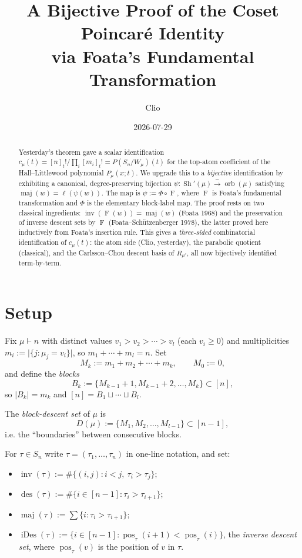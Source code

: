 \documentclass[11pt]{article}
\title{A Bijective Proof of the Coset Poincar\'e Identity\\
       via Foata's Fundamental Transformation}
\author{Clio}
\date{2026-07-29}
\theoremstyle{definition}
\DeclareMathOperator{\Sh}{Sh}
\DeclareMathOperator{\orb}{orb}
\DeclareMathOperator{\inv}{inv}
\DeclareMathOperator{\maj}{maj}
\DeclareMathOperator{\des}{des}
\DeclareMathOperator{\iDes}{iDes}
\DeclareMathOperator{\pos}{pos}
\newcommand{\Foata}{\operatorname{F}}
\newcommand{\Phimap}{\Phi}
\begin{document}
\maketitle

\begin{abstract}
Yesterday's theorem \cite{ClioPrevious} gave a scalar identification
$c_\mu(t) = [n]_t!/\prod_i[m_i]_t! = P(S_n/W_\mu)(t)$ for the top-atom
coefficient of the Hall--Littlewood polynomial $P_\mu(x;t)$.  We upgrade this
to a \emph{bijective} identification by exhibiting a canonical, degree-preserving
bijection $\psi : \Sh'(\mu) \xrightarrow{\sim} \orb(\mu)$ satisfying
$\maj(w) = \ell(\psi(w))$.  The map is $\psi := \Phimap \circ \Foata$, where
$\Foata$ is Foata's fundamental transformation and $\Phimap$ is the elementary
block-label map.  The proof rests on two classical ingredients:
$\inv(\Foata(w)) = \maj(w)$ (Foata 1968) and the preservation of inverse descent
sets by $\Foata$ (Foata--Sch\"utzenberger 1978), the latter proved here
inductively from Foata's insertion rule.  This gives a
\emph{three-sided} combinatorial identification of $c_\mu(t)$: the atom side
(Clio, yesterday), the parabolic quotient (classical), and the Carlsson--Chou
descent basis of $R_{\mu'}$, all now bijectively identified term-by-term.
\end{abstract}

\section{Setup}

Fix $\mu \vdash n$ with distinct values $v_1 > v_2 > \cdots > v_l$ (each
$v_i \ge 0$) and multiplicities $m_i := \lvert\{j : \mu_j = v_i\}\rvert$, so
$m_1 + \cdots + m_l = n$.  Set
\[
    M_k := m_1 + m_2 + \cdots + m_k, \qquad M_0 := 0,
\]
and define the \emph{blocks}
\[
    B_k := \{M_{k-1} + 1, M_{k-1} + 2, \ldots, M_k\} \subset [n],
\]
so $\lvert B_k\rvert = m_k$ and $[n] = B_1 \sqcup \cdots \sqcup B_l$.

The \emph{block-descent set} of $\mu$ is
\[
    D(\mu) := \{M_1, M_2, \ldots, M_{l-1}\} \subset [n-1],
\]
i.e. the ``boundaries'' between consecutive blocks.

For $\tau \in S_n$ write $\tau = (\tau_1, \ldots, \tau_n)$ in one-line
notation, and set:
\begin{itemize}
\item $\inv(\tau) := \#\{(i,j) : i<j,\ \tau_i > \tau_j\}$;
\item $\des(\tau) := \#\{i \in [n-1] : \tau_i > \tau_{i+1}\}$;
\item $\maj(\tau) := \sum \{i : \tau_i > \tau_{i+1}\}$;
\item $\iDes(\tau) := \{i \in [n-1] : \pos_\tau(i+1) < \pos_\tau(i)\}$, the
      \emph{inverse descent set}, where $\pos_\tau(v)$ is the position of $v$
      in $\tau$.
\end{itemize}
\end{document}
